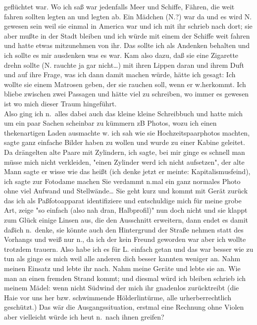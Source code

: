 \documentclass[
]{article}
\begin{document}
geflüchtet war. Wo ich saß war jedenfalls Meer und Schiffe, Fähren, die
weit fahren sollten legten an und legten ab. Ein Mädchen (N.?) war da
und es wird N. gewesen sein weil sie einmal in America war und ich mit
ihr schrieb nach dort; sie aber mußte in der Stadt bleiben und ich würde
mit einem der Schiffe weit fahren und hatte etwas mitzunehmen von ihr.
Das sollte ich als Andenken behalten und ich sollte es mir ausdenken was
es war. Kam also dazu, daß sie eine Zigarette drehn sollte (N. rauchte
ja gar nicht\ldots) mit ihren Lippen daran und ihrem Duft und auf ihre
Frage, was ich dann damit machen würde, hätte ich gesagt: Ich wollte sie
einem Matrosen geben, der sie rauchen soll, wenn er w.herkommt. Ich
bliebe zwischen zwei Passagen und hätte viel zu schreiben, wo immer es
gewesen ist wo mich dieser Traum hingeführt.\\
Also ging ich n.~alles dabei auch das kleine kleine Schreibbuch und
hatte mich um ein paar Sachen scheinbar zu kümmern zB Photos, wozu ich
einen thekenartigen Laden ausmachte w. ich sah wie sie
Hochzeitspaarphotos machten, sagte ganz einfache Bilder haben zu wollen
und wurde zu einer Kabine geleitet. Da drängelten alte Paare mit
Zylindern, ich sagte, bei mir ginge es schnell man müsse mich nicht
verkleiden, "einen Zylinder werd ich nicht aufsetzen", der alte Mann
sagte er wisse wie das heißt (ich denke jetzt er meinte:
Kapitalismusfeind), ich sagte zur Fotodame machen Sie verdammt n.mal ein
ganz normales Photo ohne viel Aufwand und Stellwände\ldots{} Sie geht
kurz und kommt mit Gerät zurück das ich als Paßfotoapparat identifiziere
und entschuldige mich für meine grobe Art, zeige "so einfach (also nah
dran, Halbprofil)" nun doch nicht und sie klappt zum Glück einige Linsen
aus, die den Ausschnitt erweitern, dann endet es damit daßich n.~denke,
sie könnte auch den Hintergrund der Straße nehmen statt des Vorhangs und
weiß nur n., da ich der kein Freund geworden war aber ich wollte
trotzdem trauern. Also habe ich es für L. einfach getan und das war
besser wie zu tun als ginge es mich weil alle anderen dich besser
kannten weniger an. Nahm meinen Einsatz und lebte ihr nach. Nahm meine
Geräte und lebte sie an. Wie man an einen fremden Strand kommt; und
diesmal würd ich bleiben schrieb ich meinem Mädel: wenn nicht Südwind
der mich ihr gnadenlos zurücktreibt (die Haie vor uns her bzw.
schwimmende Hölderlintürme, alle urherberrechtlich geschützt.) Das wär
die Ausgangssituation, erstmal eine Rechnung ohne Violen aber vielleicht
würde ich heut n.~nach ihnen greifen?
\end{document}
